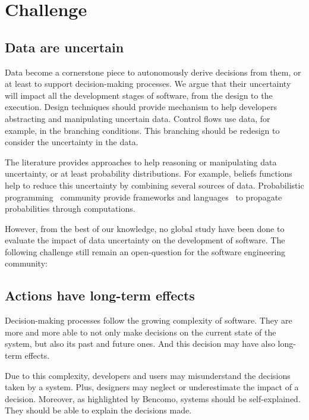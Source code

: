 \section{Challenge}

\subsection{Data are uncertain}
\label{intro:challenges:u-data}
Data become a cornerstone piece to autonomously derive decisions from them, or at least to support decision-making processes.
We argue that their uncertainty will impact all the development stages of software, from the design to the execution.
Design techniques should provide mechanism to help developers abstracting and manipulating uncertain data.
Control flows use data, for example, in the branching conditions.
This branching should be redesign to consider the uncertainty in the data.

The literature provides approaches to help reasoning or manipulating data uncertainty, or at least probability distributions.
For example, beliefs functions~\cite{shafer1992dempster} help to reduce this uncertainty by combining several sources of data.
Probabilistic programming~\cite{DBLP:conf/icse/GordonHNR14} community provide frameworks and languages~\cite{url:InferNET18, baudin2017openturns} to propagate probabilities through computations.

However, from the best of our knowledge, no global study have been done to evaluate the impact of data uncertainty on the development of software.
The following challenge still remain an open-question for the software engineering community:
\vspace{-2em}

\subsection{Actions have long-term effects}
\label{intro:challenges:long-term-act}
Decision-making processes follow the growing complexity of software.
They are more and more able to not only make decisions on the current state of the system, but also its past and future ones.
And this decision may have also long-term effects.

Due to this complexity, developers and users may misunderstand the decisions taken by a system.
Plus, designers may neglect or underestimate the impact of a decision.
Moreover, as highlighted by Bencomo\etal, systems should be self-explained.
They should be able to explain the decisions made.

